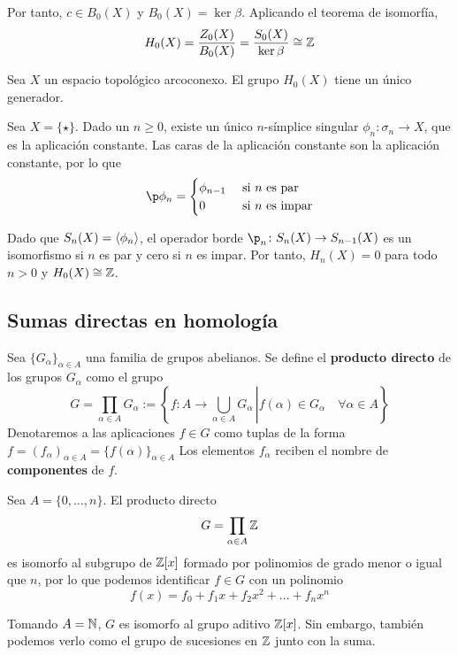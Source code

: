 
Por tanto, $c \in B_0(X)$ y $B_0(X)=\ker \beta$.
Aplicando el teorema de isomorfía,
	\[H_0(X)=\frac{Z_0(X)}{B_0(X)}=\frac{S_0(X)}{\ker \beta} \cong \mathbb{Z}\]

\begin{proposition}
	Sea $X$ un espacio topológico arcoconexo.
	El grupo $H_0(X)$ tiene un único generador.
\end{proposition}

\begin{example}
Sea $X=\{\star\}$.
Dado un $n \geq 0$, existe un único $n$-símplice singular $\phi_n\colon\sigma_n \to X$, que es la aplicación constante.
Las caras de la aplicación constante son la aplicación constante, por lo que
\begin{align*}
\p\phi_n=
	\begin{cases}
	\phi_{n-1}	&\mbox{ si }n\mbox{ es par}\\
	0          	&\mbox{ si }n\mbox{ es impar}
	\end{cases}
\end{align*}

Dado que $S_n(X)=\left\langle \phi_n\right\rangle$, el operador borde $\p_n\colon S_n(X) \to S_{n-1}(X)$ es un isomorfismo si $n$ es par y cero si $n$ es impar.
Por tanto, $H_n(X)=0$ para todo $n > 0$ y $H_0(X)\cong \mathbb{Z}$.
\end{example}

\subsection{Sumas directas en homología}
Sea $\{G_\alpha\}_{\alpha \in A}$ una familia de grupos abelianos.
Se define el \textbf{producto directo} de los grupos $G_\alpha$ como el grupo
\[G=\prod_{\alpha \in A} G_\alpha:=
	\left\{\left.f\colon A \to \bigcup_{\alpha \in A}G_\alpha\,\right|f(\alpha) \in G_\alpha \quad \forall \alpha \in A\right\}\]
Denotaremos a las aplicaciones $f \in G$ como tuplas de la forma $f=(f_\alpha)_{\alpha \in A}=\{f(\alpha)\}_{\alpha \in A}$
Los elementos $f_\alpha$ reciben el nombre de \textbf{componentes} de $f$.

\begin{example}
Sea $A=\{0,\dots, n\}$. El producto directo
\[G=\prod_{\alpha \in A}\mathbb{Z}\]
es isomorfo al subgrupo de $\mathbb{Z}[x]$ formado por polinomios de grado menor
o igual que $n$, por lo que podemos identificar $f \in G$ con un polinomio
\[f(x)=f_0+f_1x+f_2x^2+\dots+f_nx^{n}\]

Tomando $A=\mathbb{N}$, $G$ es isomorfo al grupo aditivo $\mathbb{Z}[x]$. Sin embargo,
también podemos verlo como el grupo de sucesiones en $\mathbb{Z}$ junto con la suma.
\end{example}

